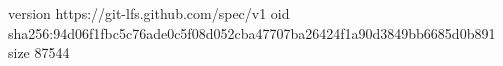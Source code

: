 version https://git-lfs.github.com/spec/v1
oid sha256:94d06f1fbc5c76ade0c5f08d052cba47707ba26424f1a90d3849bb6685d0b891
size 87544
